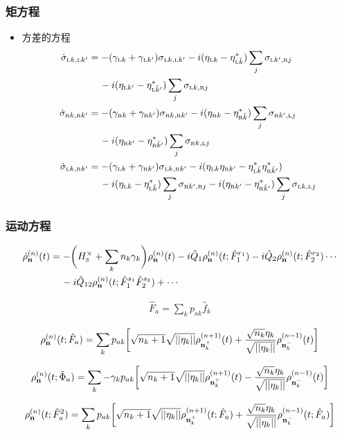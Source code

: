 \documentclass[handout,mathserif,9pt]{beamer}
\newcommand{\nl}{\nonumber \\}
\newcommand{\tL}{\mbox{\tiny L}}
\newcommand{\tR}{\mbox{\tiny R}}
\newcommand{\tS}{\mbox{\tiny S}}
\begin{document}
\begin{frame}
  \frametitle{矩方程}

  \begin{itemize}
    \item 方差的方程
    \begin{align}
      \dot \sigma_{\tL k,\tL k'} &= -(\gamma_{\tL k} + \gamma_{\tL k'})\sigma_{\tL k,\tL k'} -i (\eta_{\tL k} - \eta_{\tL \bar k}^*)\sum_{j}\sigma_{\tL k',\tR j}\nl
      &\quad \,-i (\eta_{\tL k'} - \eta_{\tL \bar k'}^*)\sum_{j}\sigma_{\tL k,\tR j} \\ 
      \dot \sigma_{\tR k,\tR k'} &= -(\gamma_{\tR k} + \gamma_{\tR k'})\sigma_{\tR k,\tR k'} -i (\eta_{\tR k} - \eta_{\tR \bar k}^*)\sum_{j}\sigma_{\tR k',\tL j}\nl
      &\quad \,-i (\eta_{\tR k'} - \eta_{\tR \bar k'}^*)\sum_{j}\sigma_{\tR k,\tL j} \\ 
      \dot \sigma_{\tL k,\tR k'} &= -(\gamma_{\tL k} + \gamma_{\tR k'})\sigma_{\tL k,\tR k'} -i (\eta_{\tL k}\eta_{\tR k'} - \eta_{\tL \bar k}^*\eta_{\tR \bar k'}^*) \nl
      &\quad \,-i (\eta_{\tL k} - \eta_{\tL \bar k}^*)\sum_{j}\sigma_{\tR k',\tR j} -i (\eta_{\tR k'} - \eta_{\tR \bar k'}^*)\sum_{j}\sigma_{\tL k,\tL j}
    \end{align}
  \end{itemize}

\end{frame}

\begin{frame}
  \frametitle{运动方程}

  \begin{align}
    \dot\rho_{\bf n}^{(n)}(t) &= -\bigg( H_{\tS}^\times + \sum_k n_k\gamma_k \bigg)\rho_{\bf n}^{(n)}(t) -i \hat Q_1\rho_{\bf n}^{(n)}(t; \hat F_1^{r_1}) -i \hat Q_2\rho_{\bf n}^{(n)}(t; \hat F_2^{r_2}) \cdots  \nl
    &\quad \,-i \hat Q_{12}\rho_{\bf n}^{(n)}(t; \hat F_1^{s_1}\hat F_2^{s_2}) + \cdots
  \end{align}

  \begin{align}
    \hat F_a = \sum_k p_{ak}\hat f_k
  \end{align}

  \begin{align}
    \rho_{\bf n}^{(n)}(t; \hat F_a) = \sum_k p_{ak} \bigg[ \sqrt{n_{k} + 1}\sqrt{||\eta_k||} \rho_{{\bf n}_{k}^+}^{(n+1)}(t) + \frac{\sqrt{n_k} \eta_k}{\sqrt{||\eta_k||}} \rho_{{\bf n}_{k}^-}^{(n-1)}(t)\bigg]
  \end{align}

  \begin{align}
    \rho_{\bf n}^{(n)}(t; \hat \Phi_a) = \sum_k -\gamma_{k}p_{ak} \bigg[ \sqrt{n_{k} + 1}\sqrt{||\eta_k||} \rho_{{\bf n}_{k}^+}^{(n+1)}(t) - \frac{\sqrt{n_k} \eta_k}{\sqrt{||\eta_k||}} \rho_{{\bf n}_{k}^-}^{(n-1)}(t)\bigg]
  \end{align}

  \begin{align}
    \rho_{\bf n}^{(n)}(t; \hat F_a^2) = \sum_k p_{ak} \bigg[ \sqrt{n_{k} + 1}\sqrt{||\eta_k||} \rho_{{\bf n}_{k}^+}^{(n+1)}(t; \hat F_a) + \frac{\sqrt{n_k} \eta_k}{\sqrt{||\eta_k||}} \rho_{{\bf n}_{k}^-}^{(n-1)}(t; \hat F_a)\bigg]
  \end{align}

\end{frame}
\end{document}
